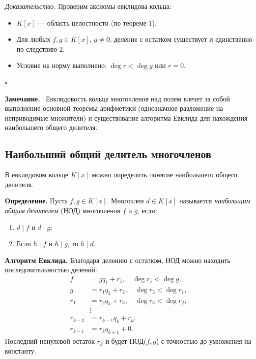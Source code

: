 \documentclass[a4paper,12pt]{article}
\newcommand{\myremark}{\textbf{Замечание.}\ }
\theoremstyle{definition}
\theoremstyle{plain}
\theoremstyle{remark}
\begin{document}
	\textit{Доказательство.} Проверим аксиомы евклидова кольца:
	\begin{itemize}
		\item \( K[x] \) — область целостности (по теореме 1).
		\item Для любых \( f, g \in K[x] \), \( g \neq 0 \), деление с остатком существует и единственно по следствию 2.
		\item Условие на норму выполнено: \( \deg r < \deg g \) или \( r = 0 \).
	\end{itemize}
	\hfill \(\square\)
	
	\myremark
	Евклидовость кольца многочленов над полем влечет за собой выполнение основной теоремы арифметики (однозначное разложение на неприводимые множители) и существование алгоритма Евклида для нахождения наибольшего общего делителя.
	
	\subsection{Наибольший общий делитель многочленов}
	
	В евклидовом кольце \( K[x] \) можно определить понятие наибольшего общего делителя.
	
	\medskip
	\noindent \textbf{Определение.} Пусть \( f, g \in K[x] \). Многочлен \( d \in K[x] \) называется \textit{наибольшим общим делителем} (НОД) многочленов \( f \) и \( g \), если:
	\begin{enumerate}
		\item \( d \mid f \) и \( d \mid g \);
		\item Если \( h \mid f \) и \( h \mid g \), то \( h \mid d \).
	\end{enumerate}
	
	\medskip
	\noindent \textbf{Алгоритм Евклида.} Благодаря делению с остатком, НОД можно находить последовательностью делений:
	\[
	\begin{aligned}
		f &= g q_1 + r_1, \quad \deg r_1 < \deg g, \\
		g &= r_1 q_2 + r_2, \quad \deg r_2 < \deg r_1, \\
		r_1 &= r_2 q_3 + r_3, \quad \deg r_3 < \deg r_2, \\
		&\vdots \\
		r_{k-2} &= r_{k-1} q_k + r_k, \\
		r_{k-1} &= r_k q_{k+1} + 0.
	\end{aligned}
	\]
	Последний ненулевой остаток \( r_k \) и будет НОД(\( f, g \)) с точностью до умножения на константу.
	
\end{document}
